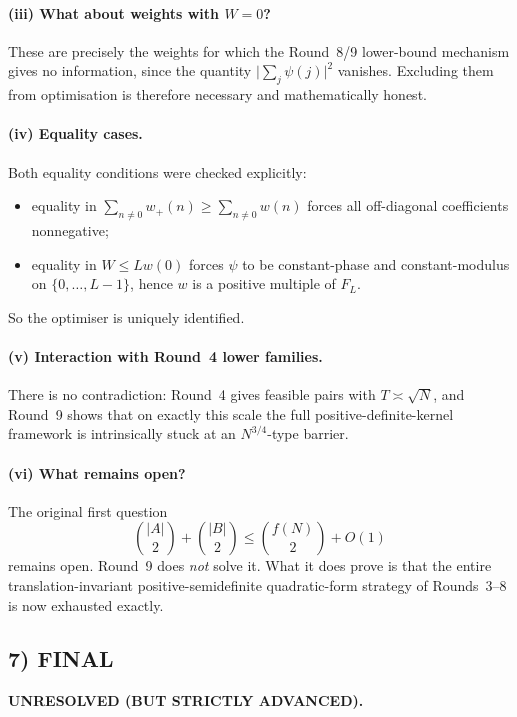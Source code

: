 \paragraph{(iii) What about weights with \(W=0\)?}
These are precisely the weights for which the Round~8/9 lower-bound mechanism gives no information, since the quantity \(\bigl|\sum_j \psi(j)\bigr|^2\) vanishes.  Excluding them from optimisation is therefore necessary and mathematically honest.

\paragraph{(iv) Equality cases.}
Both equality conditions were checked explicitly:
\begin{itemize}
\item equality in \(\sum_{n\ne 0} w_+(n)\ge \sum_{n\ne 0} w(n)\) forces all off-diagonal coefficients nonnegative;
\item equality in \(W\le L w(0)\) forces \(\psi\) to be constant-phase and constant-modulus on \(\{0,\dots,L-1\}\), hence \(w\) is a positive multiple of \(F_L\).
\end{itemize}
So the optimiser is uniquely identified.

\paragraph{(v) Interaction with Round~4 lower families.}
There is no contradiction: Round~4 gives feasible pairs with \(T\asymp \sqrt N\), and Round~9 shows that on exactly this scale the full positive-definite-kernel framework is intrinsically stuck at an \(N^{3/4}\)-type barrier.

\paragraph{(vi) What remains open?}
The original first question
\[
\binom{|A|}{2}+\binom{|B|}{2}
\le \binom{f(N)}{2}+O(1)
\]
remains open.  Round~9 does \emph{not} solve it.  What it does prove is that the entire translation-invariant positive-semidefinite quadratic-form strategy of Rounds~3--8 is now exhausted exactly.

\subsection{7) FINAL}

\textbf{UNRESOLVED (BUT STRICTLY ADVANCED).}

